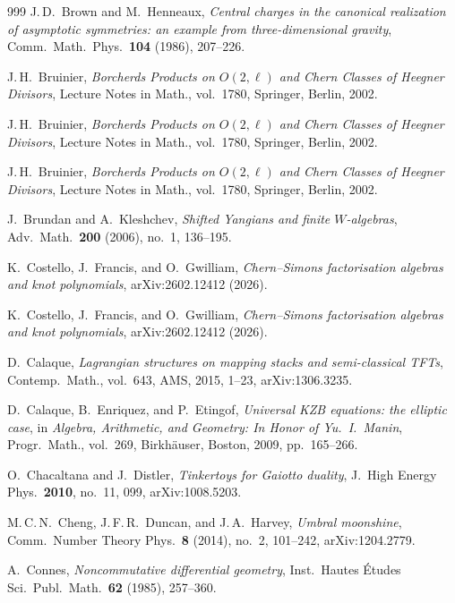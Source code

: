 \documentclass[11pt]{memoir}
\begin{document}
\begin{thebibliography}{999}
J.\,D.~Brown and M.~Henneaux, \emph{Central charges in the canonical realization of asymptotic symmetries: an example from three-dimensional gravity}, Comm.\ Math.\ Phys.\ \textbf{104} (1986), 207--226.

J.\,H.~Bruinier, \emph{Borcherds Products on $O(2,\ell)$ and Chern Classes of Heegner Divisors}, Lecture Notes in Math., vol.~1780, Springer, Berlin, 2002.

J.\,H.~Bruinier, \emph{Borcherds Products on $O(2,\ell)$ and Chern Classes of Heegner Divisors}, Lecture Notes in Math., vol.~1780, Springer, Berlin, 2002.

J.\,H.~Bruinier, \emph{Borcherds Products on $O(2,\ell)$ and Chern Classes of Heegner Divisors}, Lecture Notes in Math., vol.~1780, Springer, Berlin, 2002.

J.~Brundan and A.~Kleshchev, \emph{Shifted Yangians and finite $W$-algebras}, Adv.\ Math.\ \textbf{200} (2006), no.~1, 136--195.

K.~Costello, J.~Francis, and O.~Gwilliam, \emph{Chern--Simons factorisation algebras and knot polynomials}, arXiv:2602.12412 (2026).

K.~Costello, J.~Francis, and O.~Gwilliam, \emph{Chern--Simons factorisation algebras and knot polynomials}, arXiv:2602.12412 (2026).

D.~Calaque, \emph{Lagrangian structures on mapping stacks and semi-classical TFTs}, Contemp.\ Math., vol.~643, AMS, 2015, 1--23, arXiv:1306.3235.

D.~Calaque, B.~Enriquez, and P.~Etingof, \emph{Universal KZB equations: the elliptic case}, in \emph{Algebra, Arithmetic, and Geometry: In Honor of Yu.~I.~Manin}, Progr.\ Math., vol.~269, Birkh\"auser, Boston, 2009, pp.~165--266.

O.~Chacaltana and J.~Distler, \emph{Tinkertoys for Gaiotto duality}, J.\ High Energy Phys.\ \textbf{2010}, no.~11, 099, arXiv:1008.5203.

M.\,C.\,N.~Cheng, J.\,F.\,R.~Duncan, and J.\,A.~Harvey, \emph{Umbral moonshine}, Comm.\ Number Theory Phys.\ \textbf{8} (2014), no.~2, 101--242, arXiv:1204.2779.

A.~Connes, \emph{Noncommutative differential geometry}, Inst.\ Hautes \'Etudes Sci.\ Publ.\ Math.\ \textbf{62} (1985), 257--360.


\end{thebibliography}
\end{document}
